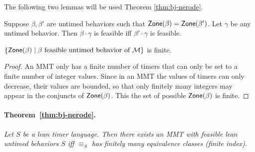 The following two lemmas will be used  Theorem \ref{thm:bj-nerode}.

\begin{lemma}
\label{lemma: feasibility concatenation}
Suppose $\beta, \beta'$ are untimed behaviors such that
$\mathsf{Zone}({\beta}) = \mathsf{Zone}({\beta'})$. Let $\gamma$ be any untimed behavior.
Then $\beta \cdot \gamma$ is feasible iff $\beta' \cdot \gamma$ is feasible.
\end{lemma}

\begin{lemma}
\label{lemma finitely many zones}
$\{ \mathsf{Zone}({\beta}) \mid \beta \mbox{ feasible untimed behavior of } {\mathcal M} \}$ is finite.
\end{lemma}
\begin{proof}
  An MMT only has a finite number of timers that can only be set to a finite number of integer values. Since in an MMT the values of timers can only decrease, their values are bounded, so that only finitely many integers may appear in the conjuncts of $\mathsf{Zone}({\beta})$. This the set of possible $\mathsf{Zone}({\beta})$ is finite.
\end{proof}

\paragraph{Theorem~\ref{thm:bj-nerode}.}
\emph{Let $S$ be a lean timer language.
Then there exists an MMT with feasible lean untimed behaviors $S$ iff
$\equiv_S$ has finitely many equivalence classes (finite index).}

